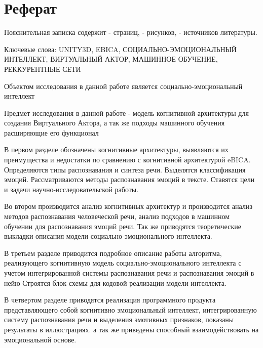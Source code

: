 \chapter*{Реферат}
\thispagestyle{plain}


Пояснительная записка содержит - страниц, - рисунков, -  источников литературы.

Ключевые слова: UNITY3D, EBICA, СОЦИАЛЬНО-ЭМОЦИОНАЛЬНЫЙ ИНТЕЛЛЕКТ, ВИРТУАЛЬНЫЙ АКТОР, МАШИННОЕ ОБУЧЕНИЕ, РЕККУРЕНТНЫЕ СЕТИ 

Объектом исследования в данной работе является социально-эмоциональный интеллект

Предмет исследования в данной работе - модель когнитивной архитектуры для создания Виртуального Актора, 
а так же подходы машинного обучения расширяющие его функционал

В первом разделе обозначены когнитивные архитектуры, выявляются их преимущества и недостатки по 
сравнению с когнитивной архитектурой eBICA. Определяются типы распознавания и синтеза речи. 
Выделятся классификация эмоций.
Рассматриваются методы распознавания эмоций в тексте.
Ставятся цели и задачи научно-исследовательской работы. 

Во втором производится анализ когнитивных архитектур и производится анализ методов распознавания человеческой речи,
анализ подходов в машинном обучении для распознавания эмоций речи.
Так же приводятся теоретические выкладки описания модели социально-эмоционального интеллекта. 

В третьем разделе приводится подробное описание работы алгоритма, реализующего когнитивную модель социально-эмоционального интеллекта с учетом
интегрированной системы распознавания речи и распознавания эмоций в нейю
Строятся блок-схемы для кодовой реализации модели интеллекта.

В четвертом разделе приводятся реализация программного продукта представляющего собой когнитивно эмоциональный интеллект, 
интегрированную систему распознавания речи и выделения эмотивных признаков, показаны результаты в иллюстрациях.
а так же приведены способный взаимодействовать на эмоциональной основе.